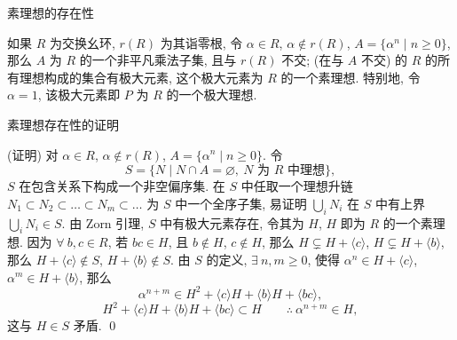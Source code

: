 
\begin{frame}{素理想的存在性}

\begin{lem}[素理想的存在性]
如果 $R$ 为交换幺环, $r(R)$ 为其诣零根, 令 $\alpha \in R$,
$\alpha \notin r(R)$, $A = \{ \alpha^n \mid n \geqslant 0 \}$,
那么 $A$ 为 $R$ 的一个非平凡乘法子集, 且与 $r(R)$ 不交;
(在与 $A$ 不交) 的 $R$ 的所有理想构成的集合有极大元素,
这个极大元素为 $R$ 的一个素理想. 特别地, 令 $\alpha = 1$,
该极大元素即 $P$ 为 $R$ 的一个极大理想.
\end{lem}

\end{frame}


\begin{frame}{素理想存在性的证明}

\startproof[bg=yellow, fg=red](证明)
对 $\alpha \in R$, $\alpha \notin r(R)$, $A = \{ \alpha^n \mid n \geqslant 0 \}$.
令
\[
S = \big\{ N \;\big|\; N \cap A = \varnothing,\ N \text{ 为 } R \text{ 中理想} \big\} ,
\]
$S$ 在包含关系下构成一个非空偏序集.
在 $S$ 中任取一个理想升链 $N_1 \subset N_2 \subset \dots \subset N_m \subset \dots$
为 $S$ 中一个全序子集, 易证明 $\bigcup_i N_i$ 在 $S$ 中有上界
$\bigcup_i N_i \in S$.
\pause
由 Zorn 引理, $S$ 中有极大元素存在, 令其为 $H$,
$H$ 即为 $R$ 的一个素理想.
因为 $\forall\ b, c \in R$, 若 $bc \in H$, 且 $b \notin H$, $c \notin H$,
那么 $H \subsetneq H + \langle c \rangle$, $H \subsetneq H + \langle b \rangle$,
那么 $H + \langle c \rangle \notin S$, $H + \langle b \rangle \notin S$.
由 $S$ 的定义, $\exists\ n, m \geqslant 0$, 使得
$\alpha^n \in H + \langle c \rangle$, $\alpha^m \in H + \langle b \rangle$,
那么
\[
\alpha^{n+m} \in H^2 + \langle c \rangle H + \langle b \rangle H + \langle bc \rangle ,
\]
\[
H^2 + \langle c \rangle H + \langle b \rangle H + \langle bc \rangle \subset H
\qquad \therefore\ \alpha^{n+m} \in H ,
\]
这与 $H \in S$ 矛盾.
\qed

\end{frame}


